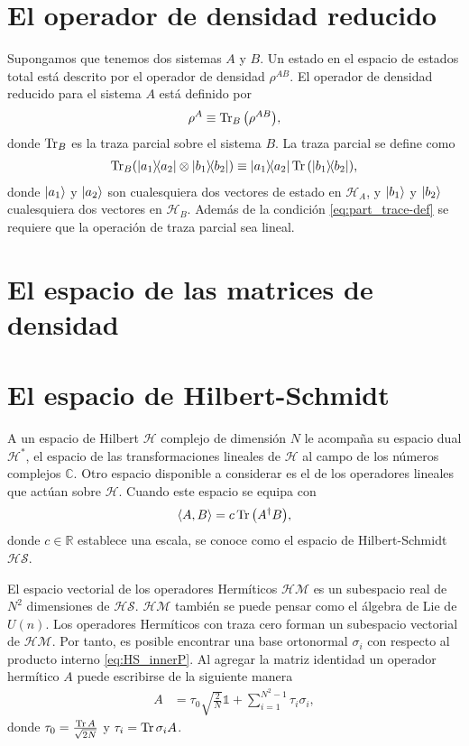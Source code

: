\documentclass[11pt,dvipsnames]{report}
\begin{document}
\section{El operador de densidad reducido}
Supongamos que tenemos dos sistemas $A$ y $B$. Un estado en el espacio de 
estados total está descrito por el operador de densidad $\rho^{AB}$. El
operador de densidad reducido para el sistema $A$ está definido por
\begin{align}
	\rho^A \equiv \Tr _B\qty(\rho^{AB}),
\end{align}
donde $\Tr_B$ es la traza parcial sobre el sistema $B$. La traza parcial
se define como 
\begin{align}
	\Tr_B (\dyad{a_1}{a_2}\otimes \dyad{b_1}{b_2})
	\equiv
	\dyad{a_1}{a_2}\Tr \qty(\dyad{b_1}{b_2}),
	\label{eq:part_trace-def}
\end{align}
donde $\ket{a_1}$ y $\ket{a_2}$ son cualesquiera dos vectores de estado en
$\mathcal{H}_A$, y $\ket{b_1}$ y $\ket{b_2}$ cualesquiera dos vectores
en $\mathcal{H}_B$. Además de la condición \eqref{eq:part_trace-def} se
requiere que la operación de traza parcial sea lineal.


\section{El espacio de las matrices de densidad} 
\section{El espacio de Hilbert-Schmidt}
A un espacio de Hilbert $\mathcal{H}$ complejo de dimensión $N$
le acompaña su espacio dual $\mathcal{H}^*$,
el espacio de las transformaciones lineales de $\mathcal{H}$
al campo de los números complejos $\mathbb{C}$. Otro espacio disponible 
a considerar es el de los operadores lineales que actúan sobre $\mathcal{H}$. 
Cuando este espacio se equipa con 
\begin{equation}
\langle A,B\rangle=c\Tr \qty(A^{\dagger}B),
\label{eq:HS_innerP}
\end{equation}
donde $c\in \mathbb{R}$ establece una escala, se conoce como el espacio de
Hilbert-Schmidt $\mathcal{HS}$. 

El espacio vectorial de los operadores Hermíticos 
$\mathcal{HM}$ es un subespacio real de $N^2$ dimensiones de $\mathcal{HS}$. 
$\mathcal{HM}$ también se puede pensar como el álgebra de Lie de $U(n)$. Los
operadores Hermíticos con traza cero forman un subespacio vectorial de
$\mathcal{HM}$. Por tanto, es posible encontrar una base ortonormal
$\sigma_i$ con
respecto al producto interno \eqref{eq:HS_innerP}. Al agregar la 
matriz identidad un operador hermítico $A$ puede escribirse de la siguiente
manera
\begin{align}
	A &= \tau_0\sqrt{\frac{2}{N}}\mathbb{1} + \sum _{i=1}^{N^2-1}\tau_i\sigma_i,
\end{align}
donde $\tau_0=\frac{\Tr A}{\sqrt{2N}}$ y $\tau_i=\Tr \sigma _iA$.
 
\end{document}
